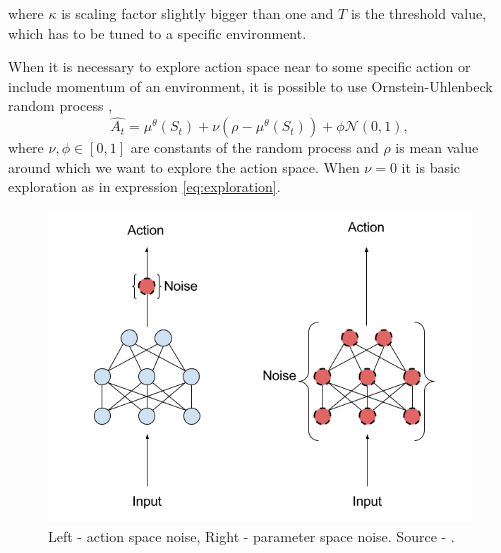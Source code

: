 where $\kappa$ is scaling factor slightly bigger than one and $T$ is the threshold value, which has to be tuned to a specific environment.
\par When it is necessary to explore action space near to some specific action or include momentum of an environment, it is possible to use Ornstein-Uhlenbeck random process \citep{lilicrap2015}, 
\begin{equation}
\hat{A_t} = \mu^\theta(S_t)  + \nu (\rho - \mu^\theta(S_t)) + \phi \mathcal{N}(0, 1),
\end{equation}
where $\nu, \phi \in [0, 1]$ are constants of the random process and $\rho$ is mean value around which we want to explore the action space. When $\nu = 0$ it is basic exploration as in expression \eqref{eq:exploration}.

\begin{figure}[H]
\centering
\includegraphics[scale=0.5]{fig/perturbations.png}
\caption[Exploration noise types]{Left - action space noise, Right - parameter space noise. Source - \cite{plappert2017}.}
\label{fig:exploration}
\end{figure}